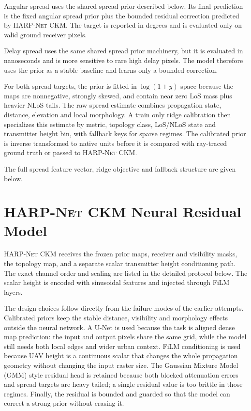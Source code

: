 Angular spread uses the shared spread prior described below. Its final
prediction is the fixed angular spread prior plus the bounded residual
correction predicted by \textsc{HARP-Net CKM}. The target is reported in
degrees and is evaluated only on valid ground receiver pixels.

Delay spread uses the same shared spread prior machinery, but it is evaluated
in nanoseconds and is more sensitive to rare high delay pixels. The model
therefore uses the prior as a stable baseline and learns only a bounded
correction.

For both spread targets, the prior is fitted in \(\log(1+y)\) space because
the maps are nonnegative, strongly skewed, and contain near zero LoS mass plus
heavier NLoS tails. The raw spread estimate combines propagation state,
distance, elevation and local morphology. A train only ridge calibration then
specializes this estimate by metric, topology class, LoS/NLoS state and
transmitter height bin, with fallback keys for sparse regimes. The calibrated
prior is inverse transformed to native units before it is compared with
ray-traced ground truth or passed to \textsc{HARP-Net CKM}.

The full spread feature vector, ridge objective and fallback structure are
given below.



\section{\textsc{HARP-Net CKM} Neural Residual Model}
\label{sec:try80_detail}

\textsc{HARP-Net CKM} receives the frozen prior maps, receiver and visibility
masks, the topology map, and a separate scalar transmitter height conditioning
path. The exact channel order and scaling are listed in the detailed protocol
below. The scalar height is encoded with sinusoidal features and injected
through FiLM layers.

The design choices follow directly from the failure modes of the earlier
attempts. Calibrated priors keep the stable distance, visibility and morphology
effects outside the neural network. A U-Net is used because the task is aligned
dense map prediction: the input and output pixels share the same grid, while
the model still needs both local edges and wider urban context. FiLM
conditioning is used because UAV height is a continuous scalar that changes the
whole propagation geometry without changing the input raster size. The Gaussian
Mixture Model (GMM) style residual head is retained because both blocked
attenuation errors and spread targets are heavy tailed; a single residual value
is too brittle in those regimes. Finally, the residual is bounded and guarded
so that the model can correct a strong prior without erasing it.

